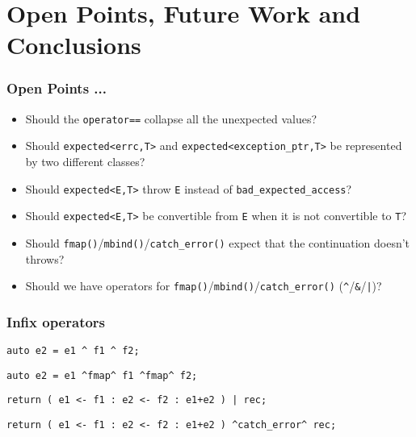 \documentclass[xcolor=dvipsnames]{beamer}
\newcommand{\cpp}[1]{\lstinline{#1}}
\begin{document}
\section{Open Points, Future Work and Conclusions}
\begin{frame}
\frametitle{Open Points ...}

\begin{itemize}
  \item Should the \cpp{operator==} collapse all the unexpected values?
  \item Should \cpp{expected<errc,T>} and \cpp{expected<exception_ptr,T>} be represented by two different classes?
  \item Should \cpp{expected<E,T>} throw \cpp{E} instead of \cpp{bad_expected_access}?
  \item Should \cpp{expected<E,T>} be convertible from \cpp{E} when it is not convertible to \cpp{T}?
  \item Should  \cpp{fmap()}/\cpp{mbind()}/\cpp{catch_error()} expect that the continuation doesn't throws?
  \item Should we have operators for  \cpp{fmap()}/\cpp{mbind()}/\cpp{catch_error()} (\cpp{^}/\cpp{&}/\cpp{|})?

\end{itemize}

\end{frame}
\begin{frame}[fragile]
\frametitle{Infix operators}

\begin{lstlisting}
auto e2 = e1 ^ f1 ^ f2;
\end{lstlisting}

\begin{lstlisting}
auto e2 = e1 ^fmap^ f1 ^fmap^ f2;
\end{lstlisting}

\begin{lstlisting}
return ( e1 <- f1 : e2 <- f2 : e1+e2 ) | rec;
\end{lstlisting}

\begin{lstlisting}
return ( e1 <- f1 : e2 <- f2 : e1+e2 ) ^catch_error^ rec;
\end{lstlisting}


\end{frame}
\end{document}
